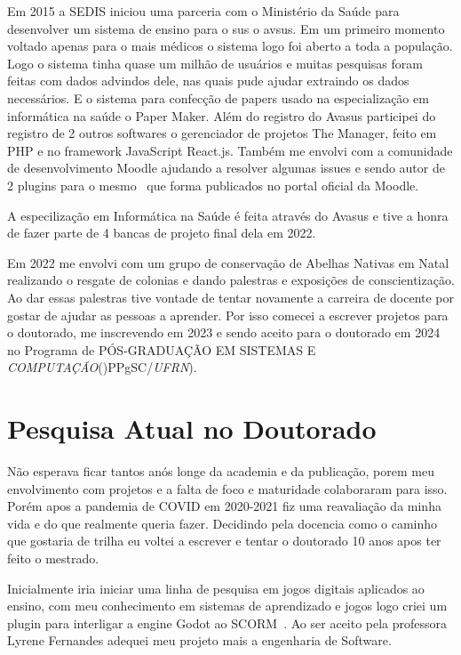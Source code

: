 \documentclass[10pt,a4paper,oneside]{book}
\begin{document}
Em 2015 a SEDIS iniciou uma parceria com o Ministério da Saúde para desenvolver um sistema de ensino para o sus o avsus.
Em um primeiro momento voltado apenas para o mais médicos o sistema logo foi aberto a toda a população.
Logo o sistema tinha quase um milhão de usuários e muitas pesquisas foram feitas com dados advindos dele, nas quais
pude ajudar extraindo os dados necessários.
E o sistema para confecção de papers usado na especialização em informática na saúde o Paper Maker.
Além do registro do Avasus participei do registro de 2 outros softwares o gerenciador de projetos The Manager, feito em
PHP e no framework JavaScript React.js.
Também me envolvi com a comunidade de desenvolvimento Moodle ajudando a resolver algumas issues e sendo autor de 2
plugins para o mesmo~\cite{moodle_tool_deletemessage,moodle_tool_sentry} que forma publicados no portal oficial da
Moodle.

A especilização em Informática na Saúde é feita através do Avasus e tive a honra de fazer parte de 4 bancas de projeto
final dela em 2022.

Em 2022 me envolvi com um grupo de conservação de Abelhas Nativas em Natal
realizando o resgate de colonias e dando palestras e exposições de conscientização.
Ao dar essas palestras tive vontade de tentar novamente a carreira de docente por gostar de ajudar as pessoas a aprender.
Por isso comecei a escrever projetos para o doutorado, me inscrevendo em 2023 e sendo aceito para o doutorado em
2024 no Programa de PÓS-GRADUAÇÃO EM SISTEMAS E \textit{COMPUTAÇÃO}()PPgSC/\textit{UFRN}).


\chapter{Pesquisa Atual no Doutorado}
\label{cap_pesquisa}
Não esperava ficar tantos anós longe da academia e da publicação, porem meu envolvimento com projetos e a falta de foco
e maturidade colaboraram para isso.
Porém apos a pandemia de COVID em 2020-2021 fiz uma reavaliação da minha vida e do que realmente queria fazer.
Decidindo pela docencia como o caminho que gostaria de trilha eu voltei a escrever e tentar o doutorado 10 anos apos ter
feito o mestrado.

Inicialmente iria iniciar uma linha de pesquisa em jogos digitais aplicados ao ensino, com meu conhecimento em sistemas
de aprendizado e jogos logo criei um plugin para interligar a engine Godot ao SCORM~\cite{godot_scorm}. Ao ser aceito
pela professora Lyrene Fernandes adequei meu projeto mais a engenharia de Software.
\end{document}
